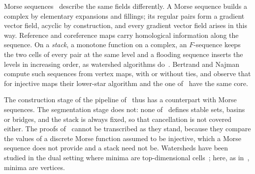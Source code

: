 \documentclass[runningheads]{llncs}
\begin{document}
Morse sequences~\cite{Ber25a} describe the same fields differently. A
Morse sequence builds a complex by elementary expansions and fillings; its
regular pairs form a gradient vector field, acyclic by construction, and
every gradient vector field arises in this way. Reference and coreference
maps carry homological information along the sequence. On a
\emph{stack}, a monotone function on a complex, an $F$-sequence keeps the
two cells of every pair at the same level and a flooding sequence inserts
the levels in increasing order, as watershed algorithms
do~\cite{Ber25b}. Bertrand and Najman~\cite{BN25} compute such sequences
from vertex maps, with or without ties, and observe that for injective maps
their lower-star algorithm and the one of~\cite{RWS11} have the same core.

The construction stage of the pipeline of~\cite{RWS11,DFRS15} thus has a
counterpart with Morse sequences. The segmentation stage does not: none
of~\cite{Ber25a,Ber25b,BN25} defines stable sets, basins or bridges, and
the stack is always fixed, so that cancellation is not covered either. The
proofs of~\cite{DFRS15} cannot be transcribed as they stand, because they
compare the values of a discrete Morse function assumed to be injective,
which a Morse sequence does not provide and a stack need not be. Watersheds
have been studied in the dual setting where minima are top-dimensional
cells~\cite{BBN23}; here, as in~\cite{DFRS15}, minima are vertices.
\end{document}
